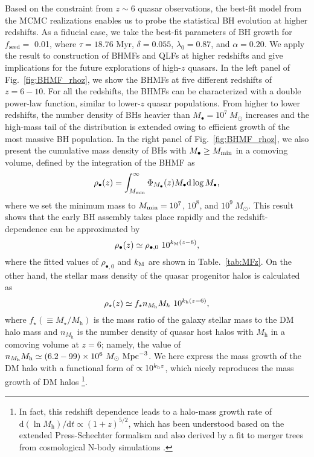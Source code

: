 \documentclass[twocolumn, twocolappendix]{aastex63}
\newcommand{\Msun}{M_\odot}
\newcommand{\Mh}{M_\mathrm{h}}
\newcommand{\Mbh}{M_\bullet}
\newcommand{\tlife}{\tau}
\newcommand{\fseed}{f_\mathrm{seed}}
\newcommand{\D}{\mathrm{d}}
\begin{document}
\begin{CJK*}{UTF8}{gbsn}
Based on the constraint from $z\sim 6$ quasar observations, the best-fit model from the MCMC realizations enables
us to probe the statistical BH evolution at higher redshifts.
As a fiducial case, we take the best-fit parameters of BH growth for $\fseed=$ 0.01,
where $\tlife=18.76$ Myr, $\delta=0.055$, $\lambda_0=0.87$, and $\alpha=0.20$.
We apply the result to construction of BHMFs and QLFs at higher redshifts and give implications for
the future explorations of high-$z$ quasars.
In the left panel of Fig.~\ref{fig:BHMF_rhoz}, we show the BHMFs at five different redshifts of $z=6-10$.
For all the redshifts, the BHMFs can be characterized with a double power-law function, similar to lower-$z$ quasar populations.
From higher to lower redshifts, the number density of BHs heavier than $M_\bullet = 10^7~\Msun$ increases
and the high-mass tail of the distribution is extended owing to efficient growth of the most massive BH population.
In the right panel of Fig.~\ref{fig:BHMF_rhoz}, we also present the cumulative mass density of BHs with $\Mbh \geq M_{\rm min}$ in a comoving volume,
defined by the integration of the BHMF as
%
\begin{equation}
 \rho_\bullet(z)=\int_{M_{\rm min}}^{\infty} \Phi_{\Mbh} (z) \Mbh \D \log \Mbh,
\end{equation}
%
where we set the minimum mass to $M_{\rm min}=10^7$, $10^8$, and $10^9~\Msun$.
This result shows that the early BH assembly takes place rapidly and the redshift-dependence can be approximated by
%
\begin{equation}
\rho_\bullet(z)
\simeq \rho_{\bullet,0}~ 10^{k_{\rm M}(z-6)},
\end{equation}
%
where the fitted values of $\rho_{\bullet,0}$ and $k_{\rm M}$ are shown in Table.~\ref{tab:MFz}.
On the other hand, the stellar mass density of the quasar progenitor halos is calculated as
%
\begin{equation}
\rho_{\star}(z)
\simeq f_\star n_{\Mh} M_h~ 10^{k_{\rm h}(z-6)},
\end{equation}
%
where $f_\star(\equiv M_\star/\Mh)$ is the mass ratio of the galaxy stellar mass to the DM halo mass and
$n_{\Mh}$ is the number density of quasar host halos with $\Mh$ in a comoving volume at $z=6$; namely,
the value of $n_{\Mh}\Mh \simeq (6.2-99)\times 10^6~\Msun~{\rm Mpc}^{-3}$.
We here express the mass growth of the DM halo with a functional form of $\propto 10^{k_{\rm h} z}$,
which nicely reproduces the mass growth of DM halos
\citep[e.g.,][]{2002ApJ...568...52W,2008MNRAS.383..615N,2008MNRAS.388.1792N,2010MNRAS.406.2267F}
\footnote[3]{
In fact, this redshift dependence leads to a halo-mass growth rate of $\D \left(\ln \Mh \right) / \D t \propto(1+z)^{5/2}$,
which has been understood based on the extended Press-Schechter formalism and also derived by
a fit to merger trees from cosmological N-body simulations \citep{2013MNRAS.435..999D}.}.


\end{CJK*}
\end{document}

